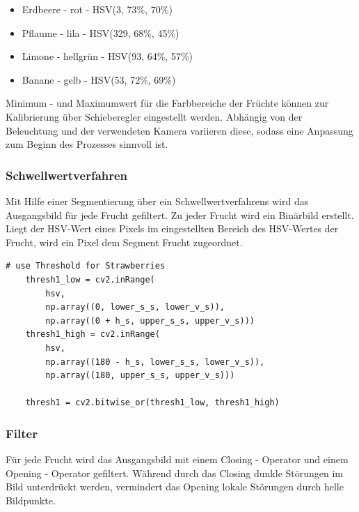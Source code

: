 \begin{itemize}
    \item Erdbeere - rot - HSV(3, 73\%, 70\%)
    \item Pflaume - lila - HSV(329, 68\%, 45\%)
    \item Limone - hellgrün - HSV(93, 64\%, 57\%)
    \item Banane - gelb - HSV(53, 72\%, 69\%)
\end{itemize}

Minimum - und Maximumwert für die Farbbereiche der Früchte können zur Kalibrierung über Schieberegler eingestellt werden. Abhängig von der Beleuchtung und der verwendeten Kamera variieren diese, sodass eine Anpassung zum Beginn des Prozesses sinnvoll ist. 

\subsubsection{Schwellwertverfahren}

Mit Hilfe einer Segmentierung über ein Schwellwertverfahrens wird das Ausgangsbild für jede Frucht gefiltert. Zu jeder Frucht wird ein Binärbild erstellt. Liegt der HSV-Wert eines Pixels im eingestellten Bereich des HSV-Wertes der Frucht, wird ein Pixel dem Segment Frucht zugeordnet. 
\begin{lstlisting}[]
    # use Threshold for Strawberries
    thresh1_low = cv2.inRange(
        hsv,
        np.array((0, lower_s_s, lower_v_s)),
        np.array((0 + h_s, upper_s_s, upper_v_s)))
    thresh1_high = cv2.inRange(
        hsv,
        np.array((180 - h_s, lower_s_s, lower_v_s)),
        np.array((180, upper_s_s, upper_v_s)))

    thresh1 = cv2.bitwise_or(thresh1_low, thresh1_high)
\end{lstlisting}

\subsubsection{Filter}

Für jede Frucht wird das Ausgangsbild mit einem Closing - Operator und einem Opening - Operator gefiltert. Während durch das Closing dunkle Störungen im Bild unterdrückt werden, vermindert das Opening lokale Störungen durch helle Bildpunkte.  \\



